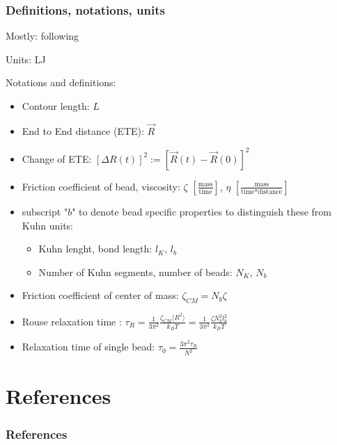 \documentclass[handout]{beamer}
\newcommand{\mean}[1]{\langle #1 \rangle}
\begin{document}
\begin{frame}
    \frametitle{Definitions, notations, units}
    Mostly: following \cite{svaneborg_2020}

    Units: LJ

    Notations and definitions:

    \begin{itemize}
        \item Contour length: $L$
        \item End to End distance (ETE): $\vec{R}$
        \item Change of ETE: $[\Delta R(t)]^2 := [\vec{R}(t)-\vec{R}(0)]^2$
        \item Friction coefficient of bead, viscosity: $\zeta$ $[\frac{\textrm{mass}}{\textrm{time}}]$, $\eta$ $[\frac{\textrm{mass}}{\textrm{time} * \textrm{distance}}]$
        \item subscript "$b$" to denote bead speciﬁc properties to distinguish these from Kuhn units:
            \begin{itemize}
                \item Kuhn lenght, bond length: $l_K$, $l_b$
                \item Number of Kuhn segments, number of beads: $N_K$, $N_b$
            \end{itemize}
        \item Friction coefficient of center of mass: $\zeta_{CM}=N_b \zeta$ 
        \item Rouse relaxation time \cite{svaneborg_2020}: $\tau_R = \frac{1}{3 \pi^2} \frac{\zeta_{CM} \mean{R^2}}{k_B T} = \frac{1}{3 \pi^2} \frac{\zeta N_b^2 l_b^2}{k_B T}$
        \item Relaxation time of single bead: $\tau_0 = \frac{3\pi^2 \tau_R}{N^2}$ 
    \end{itemize}

\end{frame}

\section{References}

\begin{frame}
    \frametitle{References}
    
    
\end{frame}
\end{document}
